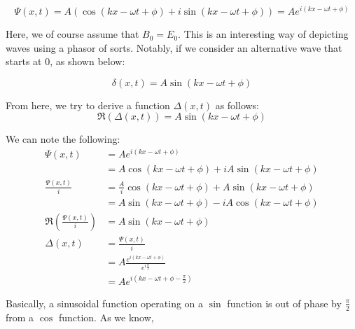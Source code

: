 \documentclass[a4paper,12pt,oneside]{book}
\begin{document}
\[ \Psi(x, t) = A \left( \cos(kx - \omega t + \phi) + i \sin(kx - \omega t + \phi) \right) = A e^{i \left(kx - \omega t + \phi \right)} \]

Here, we of course assume that $B_0 = E_0$. This is an interesting way of depicting waves using a phasor of sorts. Notably, if we consider an alternative wave that starts at 0, as shown below:

\[ \delta(x, t) = A \sin(kx - \omega t + \phi) \]

From here, we try to derive a function $\Delta(x, t)$ as follows:
\[ \Re{\left(\Delta(x, t)\right)} = A \sin(kx - \omega t + \phi) \]

We can note the following:
\begin{align*}
    \Psi(x, t) &= A e^{i \left(kx - \omega t + \phi \right)} \\
    &= A \cos(kx - \omega t + \phi) + iA \sin(kx - \omega t + \phi) \\
    \frac{\Psi(x, t)}{i} &= \frac{A}{i} \cos(kx - \omega t + \phi) + A \sin(kx - \omega t + \phi) \\
    &= A \sin(kx - \omega t + \phi) - iA \cos(kx - \omega t + \phi) \\
    \Re{\left(\frac{\Psi(x, t)}{i}\right)} &= A \sin(kx - \omega t + \phi) \\
    \Delta(x, t) &= \frac{\Psi(x, t)}{i} \\
    &= A \frac{e^{i \left(kx - \omega t + \phi \right)}}{e^{i\frac{\pi}{2}}} \\
    &= A e^{i \left(kx - \omega t + \phi - \frac{\pi}{2} \right)}
\end{align*}

Basically, a sinusoidal function operating on a $\sin$ function is out of phase by $\frac{\pi}{2}$ from a $\cos$ function. As we know,

\begin{center}
\end{center}
\end{document}
